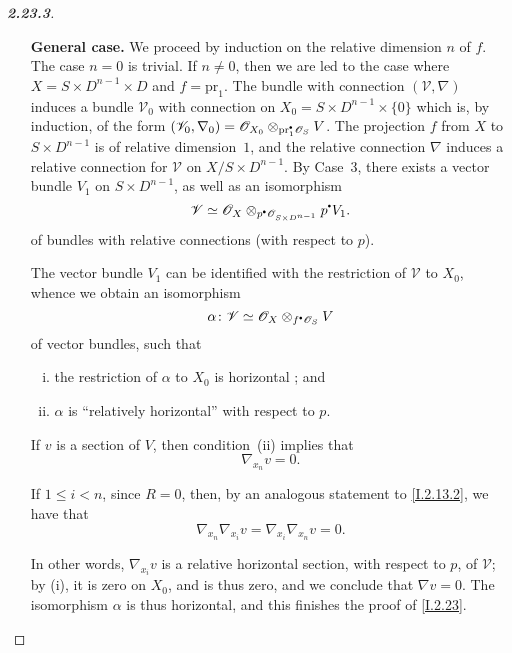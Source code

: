 \documentclass{report}
\theoremstyle{plain}
\theoremstyle{definition}
\newcommand{\sh}{\mathscr}
\newcommand{\sbullet}{{\mathbin{\vcenter{\hbox{\scalebox{.5}{$\bullet$}}}}}}
\newcommand{\pr}{\mathrm{pr}}
\renewcommand{\leq}{\leqslant}
\newcommand{\oldpage}[1]{\marginpar{\footnotesize$\Big\vert$ \textit{p.~#1}}}
\begin{document}
\begin{proof}[\normalfont\textbf{2.23.3}]
\begin{enumerate}[\bf {Case}~1:]
      We can suppose that $S$ is a closed analytic subset of $D^n$, and that $X=S\times D$ and $f=\pr_1$.
      The relative local systems (resp. the modules with relative connections) on $X$ can then be identified with the local relative systems (resp. the modules with relative connections) on $D^n\times D$ that are annihilated by the inverse image of the ideal that defines $S$, and we conclude by using Case~2.
    \item[\bf General case.]
      We proceed by induction on the relative dimension $n$ of $f$.
      The case $n=0$ is trivial.
      If $n\neq0$, then we are led to the case where $X=S\times D^{n-1}\times D$ and $f=\pr_1$.
      The bundle with connection $(\sh{V},\nabla)$ induces a bundle $\sh{V}_0$ with connection on $X_0=S\times D^{n-1}\times\{0\}$ which is, by induction, of the form $(\sh{V}_0,\nabla_0) = \sh{O}_{X_0}\otimes_{\pr_1^\sbullet\sh{O}_S}V$.
      The projection $f$ from $X$ to $S\times D^{n-1}$ is of relative dimension~$1$, and the relative connection $\nabla$ induces a relative connection for $\sh{V}$ on $X/S\times D^{n-1}$.
      By Case~3, there exists a vector bundle $V_1$ on $S\times D^{n-1}$, as well as an isomorphism
      \[
        \sh{V} \simeq \sh{O}_X\otimes_{p^\sbullet\sh{O}_{S\times D^{n-1}}}p^\sbullet V_1.
      \]
      of bundles with relative connections (with respect to $p$).

      The vector bundle $V_1$ can be identified with the restriction of $\sh{V}$ to $X_0$, whence we obtain an isomorphism
      \[
        \alpha\colon \sh{V}\simeq\sh{O}_X\otimes_{f^\sbullet\sh{O}_S}V
      \]
      of vector bundles, such that
      \begin{enumerate}[(i)]
        \item the restriction of $\alpha$ to $X_0$ is horizontal ; and
        \item $\alpha$ is ``relatively horizontal'' with respect to $p$.
      \end{enumerate}

      If $v$ is a section of $V$, then condition~(ii) implies that
      \[
        \nabla_{x_n}v = 0.
      \]

      If $1\leq i<n$, since $R=0$, then, by an analogous statement to \cref{I.2.13.2}, we have that
      \[
        \nabla_{x_n}\nabla_{x_i}v = \nabla_{x_i}\nabla_{x_n}v = 0.
      \]

      In other words, $\nabla_{x_i}v$ is a relative horizontal section, with respect to $p$, of $\sh{V}$;
      by (i), it is zero on $X_0$, and is thus zero, and we conclude that $\nabla v=0$.
      The isomorphism $\alpha$ is thus horizontal, and this finishes the proof
\oldpage{19}
      of \cref{I.2.23}.
  \end{enumerate}
\end{proof}
\end{document}
